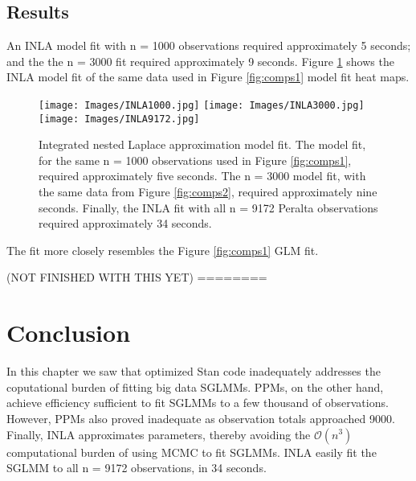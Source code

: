 \subsection{Results}
An INLA model fit with n = 1000 observations required approximately 5 seconds; and the the n = 3000 fit required approximately 9 seconds. Figure \ref{fig:INLA} shows the INLA model fit of the same data used in Figure \ref{fig:comps1} model fit heat maps.
  \begin{figure}[H]
	\centering 
	\texttt{[image: Images/INLA1000.jpg]}	
	\texttt{[image: Images/INLA3000.jpg]}
	\texttt{[image: Images/INLA9172.jpg]}
	\caption{Integrated nested Laplace approximation model fit. The model fit, for the same n = 1000 observations used in Figure \ref{fig:comps1}, required approximately five seconds. The n = 3000 model fit, with the same data from Figure \ref{fig:comps2}, required approximately nine seconds. Finally, the INLA fit with all n = 9172 Peralta observations required approximately 34 seconds.}
	\label{fig:INLA}
	\end{figure}
The fit more closely resembles the Figure \ref{fig:comps1} GLM fit.	
	
(NOT FINISHED WITH THIS YET) ========
	

\section{Conclusion}
In this chapter we saw that optimized Stan code inadequately addresses the coputational burden of fitting big data SGLMMs. PPMs, on the other hand, achieve efficiency sufficient to fit SGLMMs to a few thousand of observations. However, PPMs also proved inadequate as observation totals approached 9000. Finally, INLA approximates parameters, thereby avoiding the $\mathcal{O}(n^{3})$ computational burden of using MCMC to fit SGLMMs. INLA easily fit the SGLMM to all n = 9172 observations, in 34 seconds.
